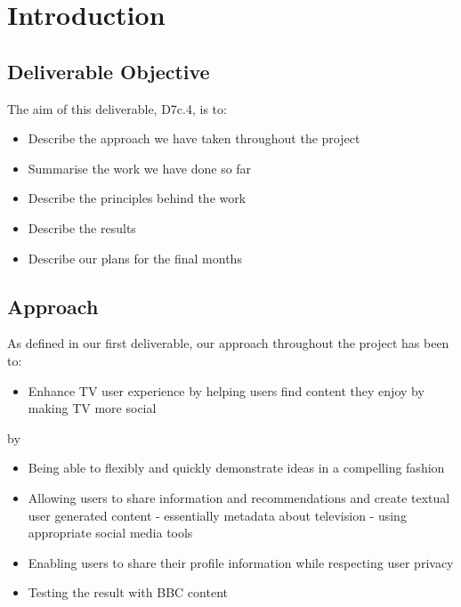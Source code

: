 \documentclass{notube}
\begin{document}
\maketitle

%

\chapter{Introduction}

\section{Deliverable Objective}

The aim of this deliverable, D7c.4, is to:
\begin{itemize}
\item{Describe the approach we have taken throughout the project}
\item{Summarise the work we have done so far}
\item{Describe the principles behind the work}
\item{Describe the results}
\item{Describe our plans for the final months}
\end{itemize}


\section{Approach}

As defined in our first deliverable, our approach throughout the project has been to:

\begin{itemize}
\item{Enhance TV user experience by helping users find content they enjoy by making TV more social}
\end{itemize}

by

\begin{itemize}
\item{Being able to flexibly and quickly demonstrate ideas in a compelling fashion}
\item{Allowing users to share information and recommendations and create textual user generated content - essentially metadata about television - using appropriate social media tools}
\item{Enabling users to share their profile information while respecting user privacy}
\item{Testing the result with BBC content}
\end{itemize}
\end{document}

